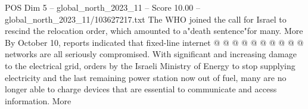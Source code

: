 \begin{textsample}{POS Dim 5 – global\_north\_2023\_11 – Score 10.00 – global\_north\_2023\_11/103627217.txt}
The WHO joined the call for Israel to rescind the relocation order, which amounted to a"death sentence"for many.
More By October 10, reports indicated that fixed-line internet @ @ @ @ @ @ @ @ @ @ networks are all seriously compromised.
With significant and increasing damage to the electrical grid, orders by the Israeli Ministry of Energy to stop supplying electricity and the last remaining power station now out of fuel, many are no longer able to charge devices that are essential to communicate and access information.
More

\end{textsample}
